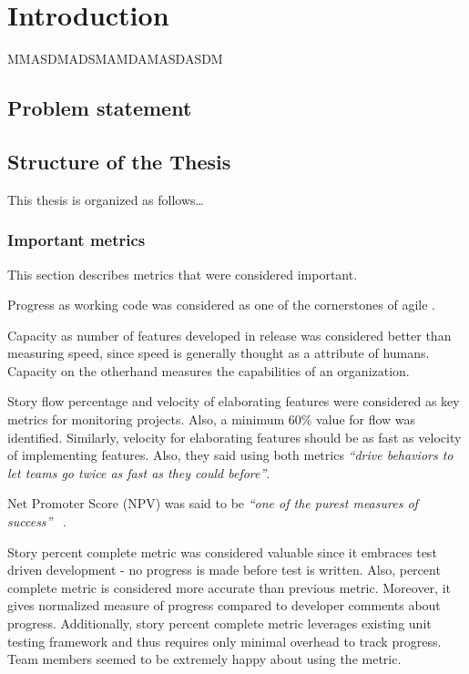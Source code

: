 \chapter{Introduction}
\label{chapter:intro}
 MMASDMADSMAMDAMASDASDM


\section{Problem statement}

 

\section{Structure of the Thesis}
\label{section:structure} 

This thesis is organized as follows\ldots

\subsection{Important metrics}
 
This section describes metrics that were considered important.

Progress as working code was considered as one of the cornerstones of agile
.

Capacity as number of features developed in release was considered better than
measuring speed, since speed is generally thought as a attribute of humans.
Capacity on the otherhand measures the capabilities of an organization.

Story flow percentage and velocity of elaborating features were considered as
key metrics for monitoring projects. Also, a minimum 60\% value for flow was
identified. Similarly, velocity for elaborating features should be as fast as
velocity of implementing features. Also, they said using both metrics
\emph{``drive behaviors to let teams go twice as fast as they could before''}. 

Net Promoter Score (NPV) was said to be \emph{``one of the purest measures of
success''} ~.

Story percent complete metric was considered valuable since it embraces test
driven development - no progress is made before test is written. Also, percent
complete metric is considered more accurate than previous metric. Moreover, it
gives normalized measure of progress compared to developer comments about
progress. Additionally, story percent complete metric leverages existing unit
testing framework and thus requires only minimal overhead to track progress.
Team members seemed to be extremely happy about using the metric.

